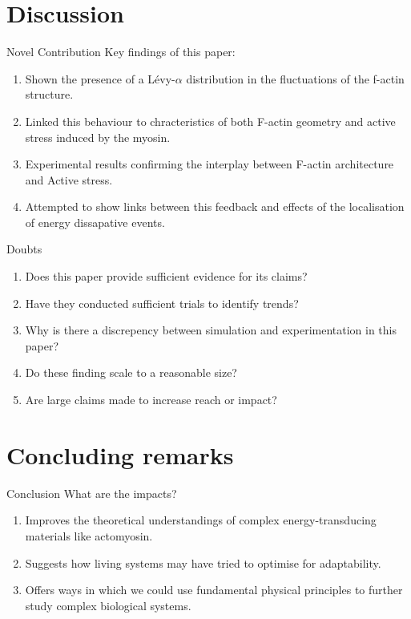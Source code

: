 \documentclass[aspectratio=169]{beamer}
\begin{document}
    \section{Discussion}
    \begin{frame}{Novel Contribution}
        Key findings of this paper:
        \begin{enumerate}
            \item Shown the presence of a L\'{e}vy-$\alpha$ distribution in the fluctuations of the f-actin structure.
            \item Linked this behaviour to chracteristics of both F-actin geometry and active stress induced by the myosin.
            \item Experimental results confirming the interplay between F-actin architecture and Active stress.
            \item Attempted to show links between this feedback and effects of the localisation of energy dissapative events.
        \end{enumerate}
    \end{frame}  

    \begin{frame}{Doubts}
        \begin{enumerate}
            \item Does this paper provide sufficient evidence for its claims?
            \item Have they conducted sufficient trials to identify trends?
            \item Why is there a discrepency between simulation and experimentation in this paper?
            \item Do these finding scale to a reasonable size?
            \item Are large claims made to increase reach or impact?
        \end{enumerate}
    \end{frame}

    \section{Concluding remarks}

    \begin{frame}{Conclusion}
        What are the impacts?
        \begin{enumerate}
            \item Improves the theoretical understandings of complex energy-transducing materials like actomyosin.
            \item Suggests how living systems may have tried to optimise for adaptability.
            \item Offers ways in which we could use fundamental physical principles to further study complex biological systems.
        \end{enumerate}
    \end{frame}
\end{document}
